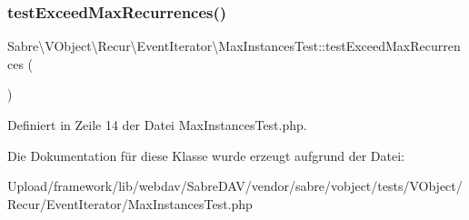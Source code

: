 \subsubsection{\texorpdfstring{test\+Exceed\+Max\+Recurrences()}{testExceedMaxRecurrences()}}
{\footnotesize\ttfamily Sabre\textbackslash{}\+V\+Object\textbackslash{}\+Recur\textbackslash{}\+Event\+Iterator\textbackslash{}\+Max\+Instances\+Test\+::test\+Exceed\+Max\+Recurrences (\begin{DoxyParamCaption}{ }\end{DoxyParamCaption})}



Definiert in Zeile 14 der Datei Max\+Instances\+Test.\+php.



Die Dokumentation für diese Klasse wurde erzeugt aufgrund der Datei\+:\begin{DoxyCompactItemize}
\item 
Upload/framework/lib/webdav/\+Sabre\+D\+A\+V/vendor/sabre/vobject/tests/\+V\+Object/\+Recur/\+Event\+Iterator/Max\+Instances\+Test.\+php\end{DoxyCompactItemize}
